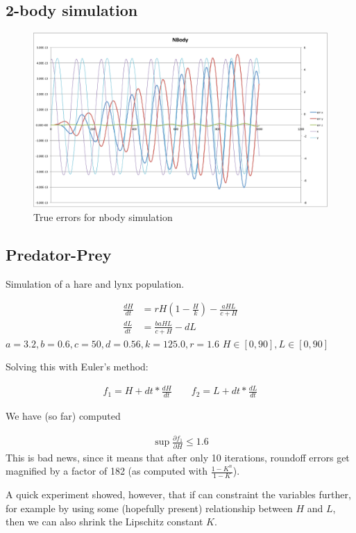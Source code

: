 \documentclass[10pt]{article}
\newcommand{\eqn}[1]{
 \begin{align} #1
 \end{align}}
\begin{document}
\subsection{2-body simulation}
\begin{figure}[h!]
  \centering
\includegraphics[width=\textwidth]{images/nbody}
  \caption{True errors for nbody simulation}
\label{fig:2body}
\end{figure}

\subsection{Predator-Prey}
Simulation of a hare and lynx population.
\eqn{
  \frac{dH}{dt} &= r H (1 - \frac{H}{k}) - \frac{a H L}{c + H}\\
  \frac{dL}{dt} &= \frac{b a H L}{c + H} - d L
}
$a = 3.2, b = 0.6, c = 50, d = 0.56, k = 125.0, r = 1.6$
$H \in [0, 90], L \in [0, 90]$

Solving this with Euler's method:
\eqn{
  f_1 = H + dt * \frac{dH}{dt} \qquad f_2 = L + dt * \frac{dL}{dt}
}

We have (so far) computed
\eqn{
  \sup \frac{\partial f_1}{\partial H} \le 1.6
}
This is bad news, since it means that after only 10 iterations, roundoff errors
get magnified by a factor of 182 (as computed with $\frac{1-K^n}{1-K}$).

A quick experiment showed, however, that if can constraint the variables further,
for example by using some (hopefully present) relationship between $H$ and $L$,
then we can also shrink the Lipschitz constant $K$.
\end{document}

